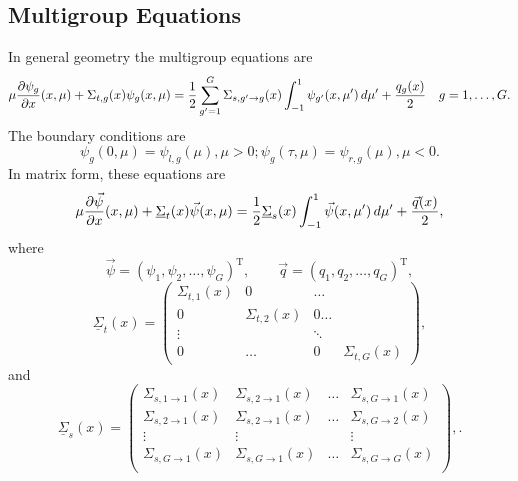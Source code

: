 \subsection{Multigroup Equations}
In general geometry the multigroup equations are 
\begin{equation}\label{eq:MG}
\mu  \frac{\partial \psi_g}{\partial x} (x,\mu) + \Sigma_{t,g}(x) \psi_g(x,\mu) =
\frac{1}{2} \sum_{g'=1}^G \Sigma_{s,g'\rightarrow g}(x) \int_{-1}^1 \psi_{g'}(x, \mu') \, d\mu' + \frac{q_g(x)}{2} \quad g=1,\dots,G.
\end{equation}The boundary conditions are
\[
\psi_g(0, \mu) = \psi_{l,g}(\mu), \mu > 0; \psi_g(\tau, \mu) = \psi_{r,g}(\mu),
\mu < 0.
\]
In matrix form, these equations are
\begin{equation}\label{eq:MGmat}
\mu  \frac{\partial \vec{\psi}}{\partial x} (x,\mu) + \underline{\Sigma}_{t}(x) \vec{\psi}(x,\mu) =
\frac{1}{2}  \underline{\Sigma}_{s}(x) \int_{-1}^1 \vec{\psi}(x, \mu') \, d\mu' + \frac{\vec{q}(x)}{2},
\end{equation}
where
\begin{equation}\label{eq:vecs}
\vec{\psi} = (\psi_1, \psi_2, \dots, \psi_G)^\mathrm{T}, \qquad \vec{q} = (q_1, q_2, \dots, q_G)^\mathrm{T}, 
\end{equation}
\begin{equation}\label{eq:MatricesT}
 \underline{\Sigma}_{t}(x)  = \begin{pmatrix} \Sigma_{t,1}(x) & 0 & \dots\\
 0 & \Sigma_{t,2}(x) & 0 \dots \\
 \vdots & & \ddots\\ 
 0 & \dots & 0 & \Sigma_{t,G}(x) 
 \end{pmatrix}, 
\end{equation}
and
\begin{equation}\label{eq:MatricesS}
 \underline{\Sigma}_{s}(x)  = \begin{pmatrix} \Sigma_{s,1\rightarrow 1}(x) & \Sigma_{s,2\rightarrow 1}(x)  & \dots & \Sigma_{s,G\rightarrow 1}(x) \\
 \Sigma_{s,2\rightarrow 1}(x) & \Sigma_{s,2\rightarrow 1}(x)  & \dots & \Sigma_{s,G\rightarrow 2}(x) \\
 \vdots & \vdots & & \vdots\\
 \Sigma_{s,G\rightarrow 1}(x) & \Sigma_{s,G\rightarrow 1}(x)  & \dots & \Sigma_{s,G\rightarrow G}(x) \\
 \end{pmatrix},.
\end{equation}

